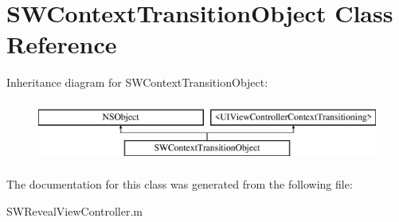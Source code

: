 \hypertarget{interface_s_w_context_transition_object}{}\section{S\+W\+Context\+Transition\+Object Class Reference}
\label{interface_s_w_context_transition_object}
Inheritance diagram for S\+W\+Context\+Transition\+Object\+:\begin{figure}[H]
\begin{center}
\leavevmode
\includegraphics[height=2.000000cm]{interface_s_w_context_transition_object}
\end{center}
\end{figure}


The documentation for this class was generated from the following file\+:\begin{DoxyCompactItemize}
\item 
S\+W\+Reveal\+View\+Controller.\+m\end{DoxyCompactItemize}
